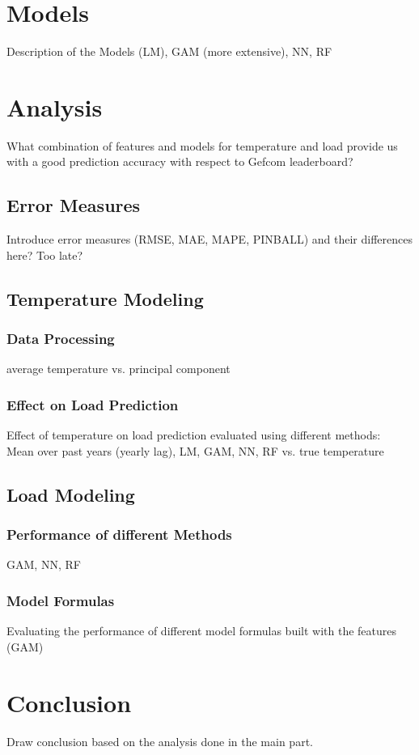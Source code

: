 \documentclass{article}
\begin{document}
\section{Models}
Description of the Models (LM), GAM (more extensive), NN, RF

\section{Analysis}
What combination of features and models for temperature and load provide us with a good prediction accuracy with respect to Gefcom leaderboard?

\subsection{Error Measures}
Introduce error measures (RMSE, MAE, MAPE, PINBALL) and their differences here? Too late?

\subsection{Temperature Modeling}
\subsubsection{Data Processing}
average temperature vs. principal component

\subsubsection{Effect on Load Prediction}
Effect of temperature on load prediction evaluated using different methods:\\
Mean over past years (yearly lag), LM, GAM, NN, RF vs. true temperature

\subsection{Load Modeling}

\subsubsection{Performance of different Methods}
GAM, NN, RF 

\subsubsection{Model Formulas}
Evaluating the performance of different model formulas built with the features (GAM)


\section{Conclusion}
Draw conclusion based on the analysis done in the main part.
\end{document}
